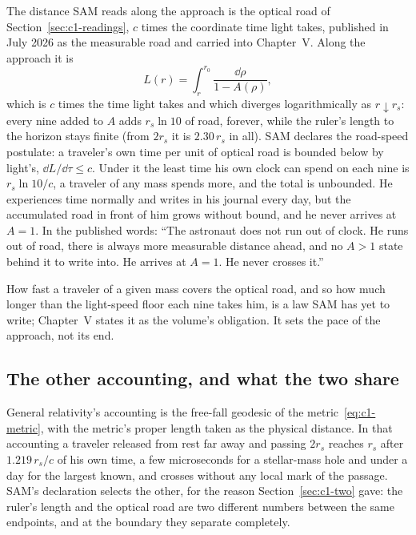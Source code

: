 The distance SAM reads along the approach is the optical road of Section~\ref{sec:c1-readings}, $c$ times the coordinate time light takes, published in July 2026 as the measurable road and carried into Chapter~V. Along the approach it is
\begin{equation}
L(r)=\int_r^{r_0}\frac{\dd\rho}{1-A(\rho)},
\label{eq:c1-measurable-road}
\end{equation}
which is $c$ times the time light takes and which diverges logarithmically as $r\downarrow r_s$: every nine added to $A$ adds $r_s\ln 10$ of road, forever, while the ruler's length to the horizon stays finite (from $2r_s$ it is $2.30\,r_s$ in all). SAM declares the road-speed postulate: a traveler's own time per unit of optical road is bounded below by light's, $\dd L/\dd\tau\le c$. Under it the least time his own clock can spend on each nine is $r_s\ln10/c$, a traveler of any mass spends more, and the total is unbounded. He experiences time normally and writes in his journal every day, but the accumulated road in front of him grows without bound, and he never arrives at $A=1$. In the published words: ``The astronaut does not run out of clock. He runs out of road, there is always more measurable distance ahead, and no $A>1$ state behind it to write into. He arrives at $A=1$. He never crosses it.''

How fast a traveler of a given mass covers the optical road, and so how much longer than the light-speed floor each nine takes him, is a law SAM has yet to write; Chapter~V states it as the volume's obligation. It sets the pace of the approach, not its end.

\subsection{The other accounting, and what the two share}

General relativity's accounting is the free-fall geodesic of the metric~\eqref{eq:c1-metric}, with the metric's proper length taken as the physical distance. In that accounting a traveler released from rest far away and passing $2r_s$ reaches $r_s$ after $1.219\,r_s/c$ of his own time, a few microseconds for a stellar-mass hole and under a day for the largest known, and crosses without any local mark of the passage. SAM's declaration selects the other, for the reason Section~\ref{sec:c1-two} gave: the ruler's length and the optical road are two different numbers between the same endpoints, and at the boundary they separate completely.

